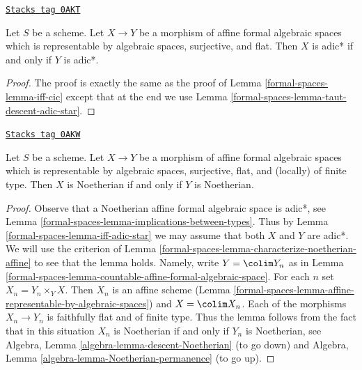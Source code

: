 \begin{lemma}
\label{formal-spaces-lemma-iff-adic-star}
\href{https://stacks.math.columbia.edu/tag/0AKT}{\texttt{Stacks tag 0AKT}}

Let $S$ be a scheme. Let $X \to Y$ be a morphism of affine
formal algebraic spaces which is representable by algebraic spaces,
surjective, and flat. Then $X$ is adic* if and only if $Y$ is adic*.
\end{lemma}

\begin{proof}
The proof is exactly the same as the proof of
Lemma \ref{formal-spaces-lemma-iff-cic} except that at the end we use
Lemma \ref{formal-spaces-lemma-taut-descent-adic-star}.
\end{proof}

\begin{lemma}
\label{formal-spaces-lemma-iff-noetherian}
\href{https://stacks.math.columbia.edu/tag/0AKW}{\texttt{Stacks tag 0AKW}}

Let $S$ be a scheme. Let $X \to Y$ be a morphism of affine
formal algebraic spaces which is representable by algebraic spaces,
surjective, flat, and (locally) of finite type. Then $X$ is Noetherian
if and only if $Y$ is Noetherian.
\end{lemma}

\begin{proof}
Observe that a Noetherian affine formal algebraic space is adic*, see
Lemma \ref{formal-spaces-lemma-implications-between-types}. Thus by
Lemma \ref{formal-spaces-lemma-iff-adic-star} we may assume that both $X$ and $Y$
are adic*. We will use the criterion of
Lemma \ref{formal-spaces-lemma-characterize-noetherian-affine}
to see that the lemma holds. Namely, write $Y = \colim Y_n$
as in Lemma \ref{formal-spaces-lemma-countable-affine-formal-algebraic-space}.
For each $n$ set $X_n = Y_n \times_Y X$. Then $X_n$ is an
affine scheme (Lemma \ref{formal-spaces-lemma-affine-representable-by-algebraic-spaces})
and $X = \colim X_n$. Each of the morphisms $X_n \to Y_n$ is
faithfully flat and of finite type. Thus the lemma follows from the
fact that in this situation $X_n$ is Noetherian if and only if $Y_n$
is Noetherian, see
Algebra, Lemma \ref{algebra-lemma-descent-Noetherian} (to go down)
and
Algebra, Lemma \ref{algebra-lemma-Noetherian-permanence} (to go up).
\end{proof}

